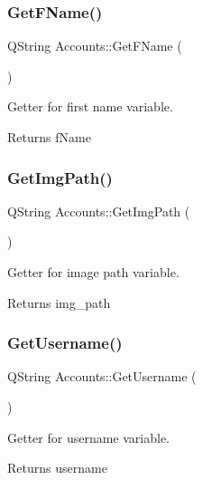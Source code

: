 \subsubsection{\texorpdfstring{Get\+F\+Name()}{GetFName()}}
{\footnotesize\ttfamily Q\+String Accounts\+::\+Get\+F\+Name (\begin{DoxyParamCaption}{ }\end{DoxyParamCaption})}



Getter for first name variable. 

\begin{DoxyReturn}{Returns}
f\+Name 
\end{DoxyReturn}
\mbox{\label{classAccounts_ad9cac5e9a586f525939b120070cbdc2d}} 
\subsubsection{\texorpdfstring{Get\+Img\+Path()}{GetImgPath()}}
{\footnotesize\ttfamily Q\+String Accounts\+::\+Get\+Img\+Path (\begin{DoxyParamCaption}{ }\end{DoxyParamCaption})}



Getter for image path variable. 

\begin{DoxyReturn}{Returns}
img\+\_\+path 
\end{DoxyReturn}
\mbox{\label{classAccounts_aa5d96a34d4281ce65a473b761ad9515a}} 
\subsubsection{\texorpdfstring{Get\+Username()}{GetUsername()}}
{\footnotesize\ttfamily Q\+String Accounts\+::\+Get\+Username (\begin{DoxyParamCaption}{ }\end{DoxyParamCaption})}



Getter for username variable. 

\begin{DoxyReturn}{Returns}
username 
\end{DoxyReturn}
\mbox{\label{classAccounts_a8a2edd82ca79c9c05341296e86c2a972}} 
